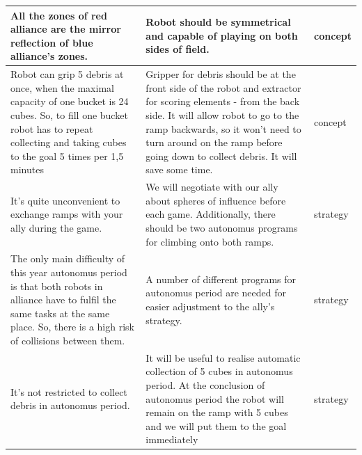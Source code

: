 \begin{table}[H]
\begin{center}
\begin{tabular}{|p{0.4\linewidth}|p{0.5\linewidth}|p{0.1\linewidth}|}
				All the zones of red alliance are the mirror reflection of blue alliance's zones. & Robot should be symmetrical and capable of playing on both sides of field. & concept \\
				\hline
				Robot can grip 5 debris at once, when the maximal capacity of one bucket is 24 cubes. So, to fill one bucket robot has to repeat collecting and taking cubes to the goal 5 times per 1,5 minutes & Gripper for debris should be at the front side of the robot and extractor for scoring elements - from the back side. It will allow robot to go to the ramp backwards, so it won't need to turn around on the ramp before going down to collect debris. It will save some time. & concept \\
				\hline
				It's quite unconvenient to exchange ramps with your ally during the game. & We will negotiate with our ally about spheres of influence before each game. Additionally, there should be two autonomus programs for climbing onto both ramps. & strategy \\
				\hline
				The only main difficulty of this year autonomus period is that both robots in alliance have to fulfil the same tasks at the same place. So, there is a high risk of collisions between them. & A number of different programs for autonomus period are needed for easier adjustment to the ally's strategy. & strategy \\
				\hline
				It's not restricted to collect debris in autonomus period. & It will be useful to realise automatic collection of 5 cubes in autonomus period. At the conclusion of autonomus period the robot will remain on the ramp with 5 cubes and we will put them to the goal immediately & strategy \\
				\hline
			\end{tabular}
		\end{center}
	\end{table}
	

